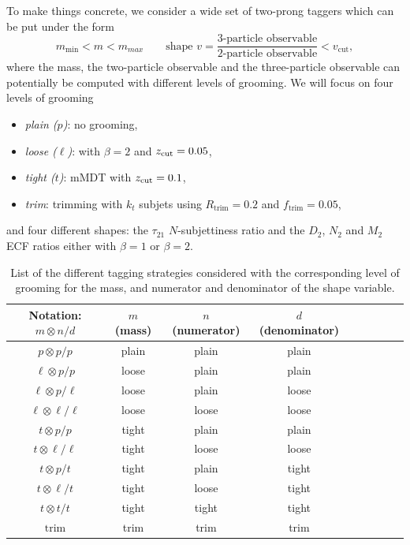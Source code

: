 To make things concrete, we consider a wide set of two-prong taggers
which can be put under the form
\begin{equation}
  m_\text{min}<m<m_{max}\qquad
  \text{shape }v=\frac{\text{3-particle observable}}{\text{2-particle observable}}<v_\text{cut},
\end{equation}
where the mass, the two-particle observable and the three-particle observable can
potentially be computed with different levels of grooming.
%
We will focus on four levels of grooming
\begin{itemize}
  \setlength\itemsep{0cm}
\item {\em plain ($p$)}: no grooming,
\item {\em loose ($\ell$)}: \SD with $\beta=2$ and $z_{\text{cut}}=0.05$,
\item {\em tight ($t$)}: mMDT with $z_{\text{cut}}=0.1$,
\item {\em trim}: trimming with $k_t$ subjets using
  $R_\text{trim}=0.2$ and $f_\text{trim}=0.05$,
\end{itemize}
and four different shapes: the $\tau_{21}$ $N$-subjettiness ratio and the
$D_2$, $N_2$ and $M_2$ ECF ratios either with $\beta=1$ or $\beta=2$.
%
\begin{table}[t!]
\begin{center}
\begin{tabular}{| c | c | c |c |c|c|c |c|c | }
  \hline                       
  Notation: $m \otimes n/d$ & $m$ (mass) & $n$ (numerator) & $d$ (denominator)\\
  \hline
  $p    \otimes    p/p$    & plain  &  plain & plain \\
  $\ell \otimes    p/p$    & loose  &  plain & plain \\
  $\ell \otimes    p/\ell$ & loose  &  plain & loose \\
  $\ell \otimes \ell/\ell$ & loose  &  loose & loose \\
  $t    \otimes    p/p$    & tight  &  plain & plain \\
  $t    \otimes \ell/\ell$ & tight  &  loose & loose \\
  $t    \otimes    p/t$    & tight  &  plain & tight \\
  $t    \otimes \ell/t$    & tight  &  loose & tight \\
  $t    \otimes    t/t$    & tight  &  tight & tight \\
  $\text{trim}$            & trim   &  trim  & trim \\
  \hline  
\end{tabular}
\end{center}
\caption{List of the different tagging strategies considered with the
  corresponding level of grooming for the mass, and
  numerator and denominator of the shape variable.}\label{table:lh-grooming-levels}
\end{table}
